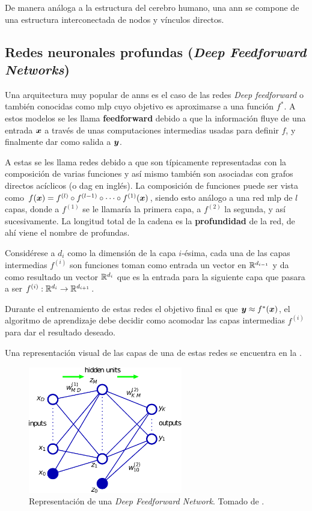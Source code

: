 De manera análoga a la estructura del cerebro humano, una \gls{ann} se compone de una estructura interconectada de nodos y vínculos directos.

\subsection{Redes neuronales profundas (\textsl{Deep Feedforward Networks})}
Una arquitectura muy popular de \glspl{ann} es el caso de las redes \textsl{Deep feedforward} o también conocidas como \gls{mlp} cuyo objetivo es aproximarse a una función $f^{\ast}$. A estos modelos se les llama \textbf{feedforward} debido a que la información fluye de una entrada ${\bm{x}}$ a través de unas computaciones intermedias usadas para definir $f$, y finalmente dar como salida a ${\bm{y}}$.

A estas se les llama redes debido a que son típicamente representadas con la composición de varias funciones y así mismo también son asociadas con grafos directos acíclicos (o \gls{dag} en inglés). La composición de funciones puede ser vista como $f({\bm{x}}) = f^{(l)} \circ f^{(l-1)} \circ \cdots \circ f^{(1)}({\bm{x}})$, siendo esto análogo a una red \gls{mlp} de $l$ capas, donde a $f^{(1)}$ se le llamaría la primera capa, a $f^{(2)}$ la segunda, y así sucesivamente. La longitud total de la cadena es la \textbf{profundidad} de la red, de ahí viene el nombre de profundas.

Considérese a $d_i$ como la dimensión de la capa $i$-\'esima, cada una de las capas intermedias $f^{(i)}$ son funciones toman como entrada un vector en $\mathbb{R}^{d_{i-1}}$ y da como resultado un vector $\mathbb{R}^{d_{i}}$ que es la entrada para la siguiente capa que pasara a ser $f^{(i)}: \mathbb{R}^{d_{i}} \rightarrow \mathbb{R}^{d_{i+1}}$.

Durante el entrenamiento de estas redes el objetivo final es que ${\bm{y}} \approx f^{\ast}({\bm{x}})$, el algoritmo de aprendizaje debe decidir como acomodar las capas intermedias $f^{(i)}$ para dar el resultado deseado.

Una representación visual de las capas de una de estas redes se encuentra en la .

\begin{figure}[H]
\centering
\includegraphics[width=0.6\textwidth]{Figures/deep-feedforward-network.pdf}
\decoRule
\caption[Representación de una \textsl{Deep Feedforward Network}]{Representación de una \textsl{Deep Feedforward Network}. Tomado de \cite{bishop-pattern-recognition}.}
\label{fig:deep-feedforward-network}
\end{figure}

